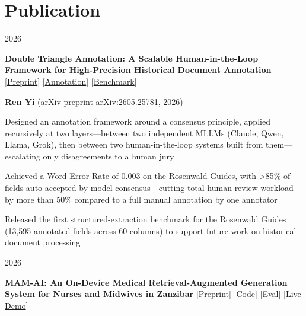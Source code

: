 \section{Publication}

        \begin{twocolentry}[1.5 cm] {2026}

\textbf{Double Triangle Annotation: A Scalable Human-in-the-Loop Framework for High-Precision Historical Document Annotation} [\href{https://arxiv.org/abs/2605.25781}{Preprint}] [\href{https://github.com/nmrenyi/double-triangle-annotation}{Annotation}] [\href{https://github.com/nmrenyi/rosenwald-benchmark}{Benchmark}]

\end{twocolentry}

        \vspace{0.10 cm}
        \begin{onecolentry}
            \textbf{Ren Yi} (arXiv preprint \href{https://arxiv.org/abs/2605.25781}{arXiv:2605.25781}, 2026)
        \end{onecolentry}
        \vspace{0.10 cm}

        \begin{onecolentry}
        \begin{highlights}
            \item Designed an annotation framework around a consensus principle, applied recursively at two layers---between two independent MLLMs (Claude, Qwen, Llama, Grok), then between two human-in-the-loop systems built from them---escalating only disagreements to a human jury
            \item Achieved a Word Error Rate of 0.003 on the Rosenwald Guides, with >85\% of fields auto-accepted by model consensus---cutting total human review workload by more than 50\% compared to a full manual annotation by one annotator
            \item Released the first structured-extraction benchmark for the Rosenwald Guides (13,595 annotated fields across 60 columns) to support future work on historical document processing
        \end{highlights}
        \end{onecolentry}

        \vspace{0.2 cm}
        \begin{twocolentry}[1.5 cm] {2026}

\textbf{MAM-AI: An On-Device Medical Retrieval-Augmented Generation System for Nurses and Midwives in Zanzibar} [\href{https://arxiv.org/abs/2606.29580}{Preprint}] [\href{https://github.com/nmrenyi/mamai}{Code}] [\href{https://github.com/nmrenyi/mamai-eval}{Eval}] [\href{https://nmrenyi-mamai-demo.hf.space}{Live Demo}]

\end{twocolentry}


